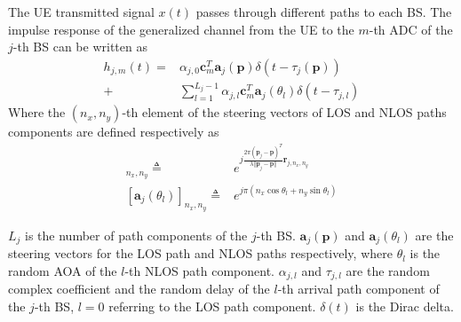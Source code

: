 \documentclass[journal]{IEEEtran}
\begin{document}
The UE transmitted signal $x(t)$ passes through different paths to each BS. The impulse response of the generalized channel from the UE to the $m$-th ADC of the $j$-th BS can be written as 
\begin{align}\label{IR}
  h_{j,m}(t)=&\alpha_{j,0}\boldsymbol{c}_m^T\boldsymbol{a}_j(\boldsymbol{p})\delta(t-\tau_j(\boldsymbol{p}))\\\nonumber
  +&\sum_{l=1}^{L_j-1}\alpha_{j,l}\boldsymbol{c}_m^T\boldsymbol{a}_j(\theta_l)\delta(t-\tau_{j,l})
\end{align}
Where the $(n_x,n_y)$-th element of the steering vectors of LOS and NLOS paths components are defined respectively as
\begin{align}
  [\boldsymbol{a}_j(\boldsymbol{p})]_{n_x,n_y}\triangleq& e^{j\frac{2\pi(\boldsymbol{p}_j-\boldsymbol{p})^T}{\lambda\Vert\boldsymbol{p}_j-\boldsymbol{p}\Vert}\boldsymbol{r}_{j,n_x,n_y}}\\ \nonumber
  [\boldsymbol{a}_j(\theta_l)]_{n_x,n_y}\triangleq&e^{j\pi(n_x\cos\theta_l+n_y\sin\theta_l)}
\end{align}

$L_j$ is the number of path components of the $j$-th BS. $\boldsymbol{a}_j(\boldsymbol{p})$ and $\boldsymbol{a}_j(\theta_l)$ are the steering vectors for the LOS path and NLOS paths respectively, where $\theta_l$ is the random AOA of the $l$-th NLOS path component.
$\alpha_{j,l}$ and $\tau_{j,l}$ are the random complex coefficient and the random delay of the $l$-th arrival path component of the $j$-th BS, $l=0$ referring to the LOS path component. $\delta(t)$ is the Dirac delta.
\end{document}
